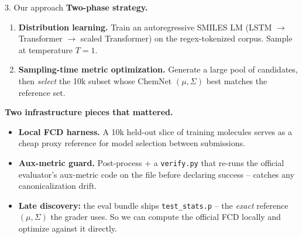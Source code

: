 \documentclass[aspectratio=169,11pt]{beamer}
\begin{document}
\begin{frame}{3. Our approach}
  \textbf{Two-phase strategy.}
  \begin{enumerate}
    \item \textbf{Distribution learning.} Train an autoregressive SMILES LM
      (LSTM $\rightarrow$ Transformer $\rightarrow$ scaled Transformer)
      on the regex-tokenized corpus. Sample at temperature $T=1$.
    \item \textbf{Sampling-time metric optimization.} Generate a large pool
      of candidates, then \emph{select} the 10k subset whose ChemNet
      $(\mu,\Sigma)$ best matches the reference set.
  \end{enumerate}

  \vspace{0.5em}
  \textbf{Two infrastructure pieces that mattered.}
  \begin{itemize}
    \item \textbf{Local FCD harness.} A 10k held-out slice of training
      molecules serves as a cheap proxy reference for model selection
      between submissions.
    \item \textbf{Aux-metric guard.} Post-process + a \texttt{verify.py}
      that re-runs the official evaluator's aux-metric code on the file
      before declaring success -- catches any canonicalization drift.
    \item \textbf{Late discovery:} the eval bundle ships
      \texttt{test\_stats.p} -- the \emph{exact} reference $(\mu,\Sigma)$
      the grader uses. So we can compute the official FCD locally and
      optimize against it directly.
  \end{itemize}
\end{frame}
\end{document}
